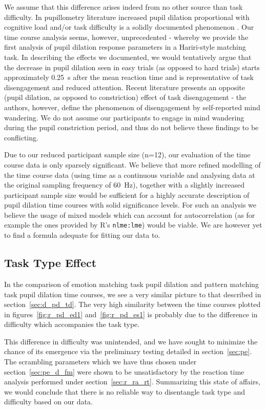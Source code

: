 	    We assume that this difference arises indeed from no other source than task difficulty.   
	    In pupillometry literature increased pupil dilation proportional with cognitive load and/or task difficulty is a solidly documented phenomenon \citep{Piquado2010}.
	    Our time course analysis seems, however, unprecedented - whereby we provide the first analysis of pupil dilation response parameters in a Hariri-style matching task.
	    In describing the effects we documented, we would tentatively argue that the decrease in pupil dilation seen in easy trials (as opposed to hard trials) starts approximately \SI{0.25}{\second} after the mean reaction time and is representative of task disengagement and reduced attention.
	    Recent literature presents an opposite (pupil dilation, as opposed to constriction) effect of task disengagement \citep{Franklin2013} - the authors, however, define the phenomenon of disengagement by self-reported mind wandering.
	    We do not assume our participants to engage in mind wandering during the pupil constriction period, and thus do not believe these findings to be conflicting.  
	    
	    Due to our reduced participant sample size (n=12), our evaluation of the time course data is only sparsely significant.
	    We believe that more refined modelling of the time course data (using time as a continuous variable and analysing data at the original sampling frequency of \SI{60}{\hertz}), together with a slightly increased participant sample size would be sufficient for a highly accurate description of pupil dilation time courses with solid significance levels.
	    For such an analysis we believe the usage of mixed models which can account for autocorrelation (as for example the ones provided by R's \colorbox{vlg}{\texttt{nlme:lme}}) would be viable.
	    We are however yet to find a formula adequate for fitting our data to.
	\subsection{Task Type Effect}
	    In the comparison of emotion matching task pupil dilation and pattern matching task pupil dilation time courses, we see a very similar picture to that described in section~\ref{sec:d_pd_td}.
	    The very high similarity between the time courses plotted in figures~\ref{fig:r_pd_ed1} and~\ref{fig:r_pd_es1} is probably due to the difference in difficulty which accompanies the task type.
	    
	    This difference in difficulty was unintended, and we have sought to minimize the chance of its emergence via the preliminary testing detailed in section~\ref{sec:pe}.
	    The scrambling parameters which we have thus chosen under section~\ref{sec:pe_d_fm} were shown to be unsatisfactory by the reaction time analysis performed under section~\ref{sec:r_ra_rt}.
	    Summarizing this state of affairs, we would conclude that there is no reliable way to disentangle task type and difficulty based on our data.
	    
